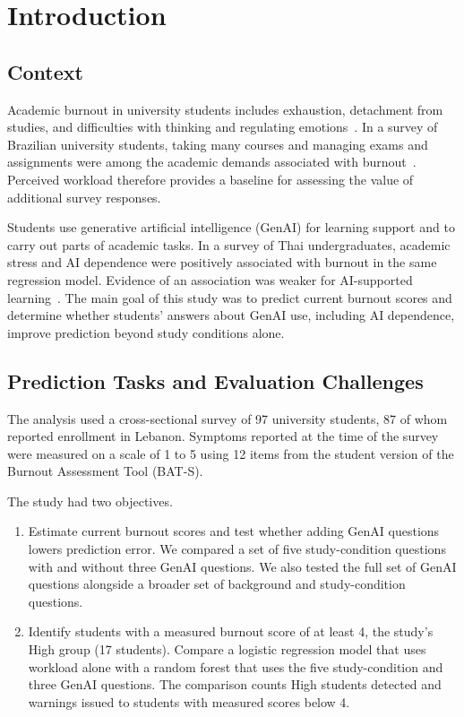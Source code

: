 \section{Introduction}
\label{sec:introduction}

\subsection{Context}

Academic burnout in university students includes exhaustion, detachment from studies, and difficulties with thinking and regulating emotions~\cite{carmonahalty2024bats}. In a survey of Brazilian university students, taking many courses and managing exams and assignments were among the academic demands associated with burnout~\cite{camara2024stressors}. Perceived workload therefore provides a baseline for assessing the value of additional survey responses.

Students use generative artificial intelligence (GenAI) for learning support and to carry out parts of academic tasks. In a survey of Thai undergraduates, academic stress and AI dependence were positively associated with burnout in the same regression model. Evidence of an association was weaker for AI-supported learning~\cite{plensamai2026burnout}. The main goal of this study was to predict current burnout scores and determine whether students' answers about GenAI use, including AI dependence, improve prediction beyond study conditions alone.

\subsection{Prediction Tasks and Evaluation Challenges}

The analysis used a cross-sectional survey of 97 university students, 87 of whom reported enrollment in Lebanon. Symptoms reported at the time of the survey were measured on a scale of 1 to 5 using 12 items from the student version of the Burnout Assessment Tool (BAT-S).

The study had two objectives.

\begin{enumerate}
\item Estimate current burnout scores and test whether adding GenAI questions lowers prediction error. We compared a set of five study-condition questions with and without three GenAI questions. We also tested the full set of GenAI questions alongside a broader set of background and study-condition questions.
\item Identify students with a measured burnout score of at least 4, the study's High group (17 students). Compare a logistic regression model that uses workload alone with a random forest that uses the five study-condition and three GenAI questions. The comparison counts High students detected and warnings issued to students with measured scores below 4.
\end{enumerate}


